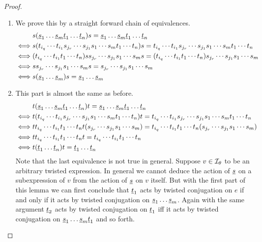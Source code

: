 \begin{lemm}
\begin{proof}
		\begin{enumerate}
			\item We prove this by a straight forward chain of equivalences.
			\begin{align*}
						& s (\underline{s}_1 \ldots \underline{s}_m \underline{t}_1 \ldots \underline{t}_n) s  =  \underline{s}_1 \ldots \underline{s}_m \underline{t}_1 \ldots \underline{t}_n \\
				\iff	& s (t_{i_q} \cdots t_{i_1} s_{j_r} \cdots s_{j_1} s_1 \cdots s_m t_1 \cdots t_n) s  =  t_{i_q} \cdots t_{i_1} s_{j_r} \cdots s_{j_1} s_1 \cdots s_m t_1 \cdots t_n \\
				\iff	& (t_{i_q} \cdots t_{i_1} t_1 \cdots t_n) s s_{j_r} \cdots s_{j_1} s_1 \cdots s_m s  =  (t_{i_q} \cdots t_{i_1} t_1 \cdots t_n) s_{j_r} \cdots s_{j_1} s_1 \cdots s_m \\
				\iff	& s s_{j_r} \cdots s_{j_1} s_1 \cdots s_m s  =  s_{j_r} \cdots s_{j_1} s_1 \cdots s_m \\
				\iff	& s (\underline{s}_1 \ldots \underline{s}_m) s = \underline{s}_1 \ldots \underline{s}_m
			\end{align*}
			\item This part is almost the same as before.
			\begin{align*}
						& t (\underline{s}_1 \ldots \underline{s}_m \underline{t}_1 \ldots \underline{t}_n) t  =  \underline{s}_1 \ldots \underline{s}_m \underline{t}_1 \ldots \underline{t}_n \\
				\iff	& t (t_{i_q} \cdots t_{i_1} s_{j_r} \cdots s_{j_1} s_1 \cdots s_m t_1 \cdots t_n) t  =  t_{i_q} \cdots t_{i_1} s_{j_r} \cdots s_{j_1} s_1 \cdots s_m t_1 \cdots t_n \\
				\iff	& t t_{i_q} \cdots t_{i_1} t_1 \cdots t_n t (s_{j_r} \cdots s_{j_1} s_1 \cdots s_m)  =  t_{i_q} \cdots t_{i_1} t_1 \cdots t_n (s_{j_r} \cdots s_{j_1} s_1 \cdots s_m) \\
				\iff	& t t_{i_q} \cdots t_{i_1} t_1 \cdots t_n t  =  t_{i_q} \cdots t_{i_1} t_1 \cdots t_n \\
				\iff	& t (\underline{t}_1 \ldots \underline{t}_n) t = \underline{t}_1 \ldots \underline{t}_n
			\end{align*}
			Note that the last equivalence is not true in general. Suppose $v \in \mathcal{I}_{\theta}$ to be an arbitrary twisted expression. In general we cannot deduce the action of $\underline{s}$ on a subexpression of $v$ from the action of $\underline{s}$ on $v$ itself. But with the first part of this lemma we can first conclude that $\underline{t}_1$ acts by twisted conjugation on $e$ if and only if it acts by twisted conjugation on $\underline{s}_1 \ldots \underline{s}_m$. Again with the same argument $\underline{t}_2$ acts by twisted conjugation on $\underline{t}_1$ iff it acts by twisted conjugation on $\underline{s}_1 \ldots \underline{s}_m \underline{t}_1$ and so forth.

\end{enumerate}
\end{proof}
\end{lemm}
